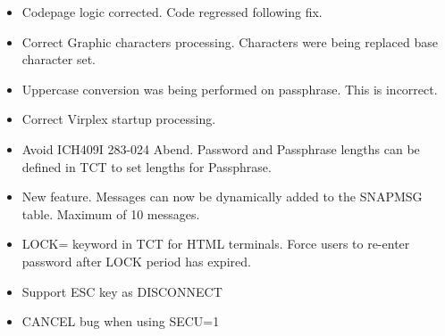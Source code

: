 \documentclass[letterpaper,10pt,english]{sphinxmanual}
\begin{document}
\begin{itemize}
\item {} 
Codepage logic corrected. Code regressed following fix.

\end{itemize}

\begin{itemize}
\item {} 
Correct Graphic characters processing. Characters were being replaced base character set.

\end{itemize}

\begin{itemize}
\item {} 
Uppercase conversion was being performed on passphrase. This is incorrect.

\end{itemize}

\begin{itemize}
\item {} 
Correct Virplex startup processing.

\end{itemize}

\begin{itemize}
\item {} 
Avoid ICH409I 283-024 Abend. Password and Passphrase lengths can be defined in TCT to set lengths for Passphrase.

\end{itemize}

\begin{itemize}
\item {} 
New feature. Messages can now be dynamically added to the SNAPMSG table. Maximum of 10 messages.

\end{itemize}

\begin{itemize}
\item {} 
LOCK= keyword in TCT for HTML terminals. Force users to re-enter password after LOCK period has expired.

\item {} 
Support ESC key as DISCONNECT

\item {} 
CANCEL bug when using SECU=1

\end{itemize}
\end{document}
